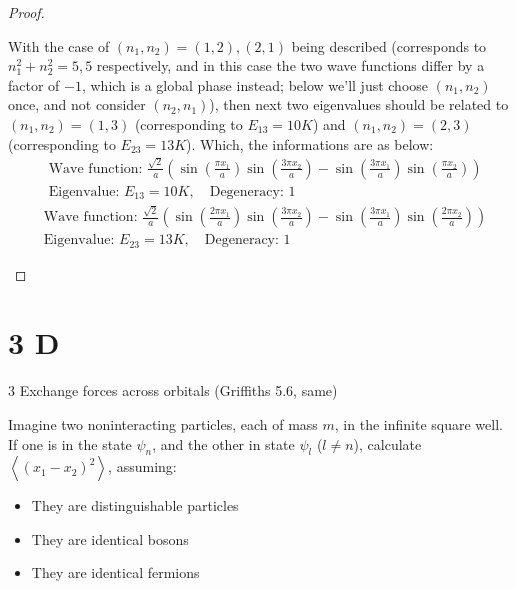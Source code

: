 \documentclass{article}
\begin{document}
\begin{proof}
\begin{itemize}
\begin{itemize}
            With the case of $(n_1,n_2)=(1,2),(2,1)$ being described (corresponds to $n_1^2+n_2^2=5,5$ respectively, and in this case the two wave functions differ by a factor of $-1$, which is a global phase instead; below we'll just choose $(n_1,n_2)$ once, and not consider $(n_2,n_1)$), then next two eigenvalues should be related to $(n_1,n_2) = (1,3)$ (corresponding to $E_{13}=10K$) and $(n_1,n_2)=(2,3)$ (corresponding to $E_{23}=13K$). Which, the informations are as below:
            \begin{align}
                &\text{Wave function: } \frac{\sqrt{2}}{a}\left(\sin\left(\frac{\pi x_1}{a}\right)\sin\left(\frac{3\pi x_2}{a}\right)-\sin\left(\frac{3\pi x_1}{a}\right)\sin\left(\frac{\pi x_2}{a}\right)\right)\\
                &\text{Eigenvalue: } E_{13} = 10K,\quad\text{Degeneracy: } 1
            \end{align}
            \begin{align}
                &\text{Wave function: } \frac{\sqrt{2}}{a}\left(\sin\left(\frac{2\pi x_1}{a}\right)\sin\left(\frac{3\pi x_2}{a}\right)-\sin\left(\frac{3\pi x_1}{a}\right)\sin\left(\frac{2\pi x_2}{a}\right)\right)\\
                &\text{Eigenvalue: } E_{23} = 13K,\quad\text{Degeneracy: } 1
            \end{align}
        \end{itemize}
    \end{itemize}
\end{proof}

\newpage

\section*{3 D}
\begin{ques}
3 Exchange forces across orbitals (Griffiths 5.6, same)

Imagine two noninteracting particles, each of mass $m$, in the infinite square well. If one is in the state $\psi_n$, and the other in state $\psi_l$ ($l\neq n$), calculate $\left<(x_1-x_2)^2\right>$, assuming:
\begin{itemize}
    \item[(a)] They are distinguishable particles
    \item[(b)] They are identical bosons
    \item[(c)] They are identical fermions  
\end{itemize}
\end{ques}
\end{document}
